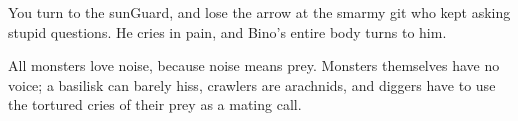 \label{5E}

You turn to the \gls{sunGuard}, and lose the arrow at the smarmy git who kept asking stupid questions.
He cries in pain, and Bino's entire body turns to him.

All monsters love noise, because noise means prey.
Monsters themselves have no voice; a basilisk can barely hiss, \glspl{crawler} are arachnids, and \glspl{digger} have to use the tortured cries of their prey as a mating call.

